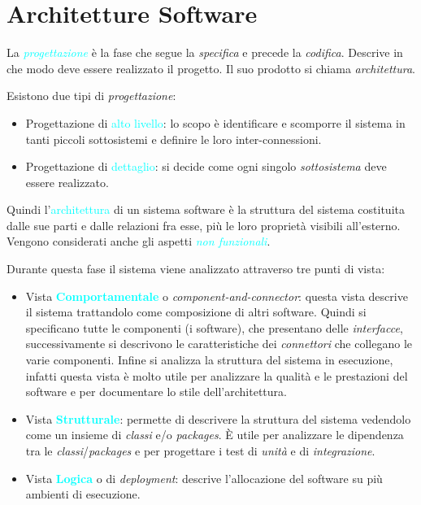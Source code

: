 \section{Architetture Software}
La \emph{\textcolor{cyan}{progettazione}} è la fase che segue la \emph{specifica} e
precede la \emph{codifica}. Descrive in che modo deve essere realizzato il progetto. Il suo
prodotto si chiama \emph{architettura}.

Esistono due tipi di \emph{progettazione}:
\begin{itemize}
    \item Progettazione di \textcolor{cyan}{alto livello}: lo scopo è identificare
        e scomporre il sistema in tanti piccoli sottosistemi e definire le loro inter-connessioni.
    \item Progettazione di \textcolor{cyan}{dettaglio}: si decide come ogni singolo \emph{sottosistema} deve
        essere realizzato.
\end{itemize}

Quindi l'\textcolor{cyan}{architettura} di un sistema software è la
struttura del sistema costituita dalle sue parti e dalle relazioni fra esse,
più le loro proprietà visibili all'esterno. Vengono considerati anche gli aspetti
\emph{\textcolor{cyan}{non funzionali}}.

Durante questa fase il sistema viene analizzato attraverso tre punti di vista:
\begin{itemize}
    \item Vista \textbf{\textcolor{cyan}{Comportamentale}} o \emph{component-and-connector}: questa vista descrive il sistema trattandolo
        come composizione di altri software. Quindi si specificano tutte le componenti (i software), che presentano delle \emph{interfacce},
        successivamente si descrivono le caratteristiche dei \emph{connettori} che collegano le varie componenti. Infine si
        analizza la struttura del sistema in esecuzione, infatti questa vista è molto utile per analizzare la qualità e le prestazioni del software e per documentare
        lo stile dell'architettura. 
    \item Vista \textbf{\textcolor{cyan}{Strutturale}}: permette di descrivere la struttura del sistema vedendolo
        come un insieme di \emph{classi} e/o \emph{packages}. È utile per analizzare le dipendenza tra le \emph{classi}/\emph{packages}
        e per progettare i test di \emph{unità} e di \emph{integrazione}.
    \item Vista \textbf{\textcolor{cyan}{Logica}} o di \emph{deployment}: descrive l'allocazione del software su più ambienti di esecuzione.
\end{itemize}

